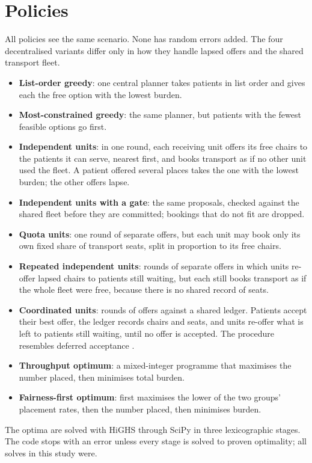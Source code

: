 \documentclass[11pt,a4paper]{article}
\begin{document}
\section{Policies}
All policies see the same scenario. None has random errors added. The four decentralised variants differ only
in how they handle lapsed offers and the shared transport fleet.
\begin{itemize}
\item \textbf{List-order greedy}: one central planner takes patients in list order and gives each the free
option with the lowest burden.
\item \textbf{Most-constrained greedy}: the same planner, but patients with the fewest feasible options go first.
\item \textbf{Independent units}: in one round, each receiving unit offers its free chairs to the patients it
can serve, nearest first, and books transport as if no other unit used the fleet. A patient offered several
places takes the one with the lowest burden; the other offers lapse.
\item \textbf{Independent units with a gate}: the same proposals, checked against the shared fleet before they
are committed; bookings that do not fit are dropped.
\item \textbf{Quota units}: one round of separate offers, but each unit may book only its own fixed share of
transport seats, split in proportion to its free chairs.
\item \textbf{Repeated independent units}: rounds of separate offers in which units re-offer lapsed chairs to
patients still waiting, but each still books transport as if the whole fleet were free, because there is no
shared record of seats.
\item \textbf{Coordinated units}: rounds of offers against a shared ledger. Patients accept their best offer,
the ledger records chairs and seats, and units re-offer what is left to patients still waiting, until no
offer is accepted. The procedure resembles deferred acceptance \citep{gale1962college}.
\item \textbf{Throughput optimum}: a mixed-integer programme that maximises the number placed, then minimises
total burden.
\item \textbf{Fairness-first optimum}: first maximises the lower of the two groups' placement rates, then the
number placed, then minimises burden.
\end{itemize}
The optima are solved with HiGHS \citep{huangfu2018highs} through SciPy \citep{virtanen2020scipy} in three
lexicographic stages. The code stops with an error unless every stage is solved to proven optimality; all
solves in this study were.
\end{document}
